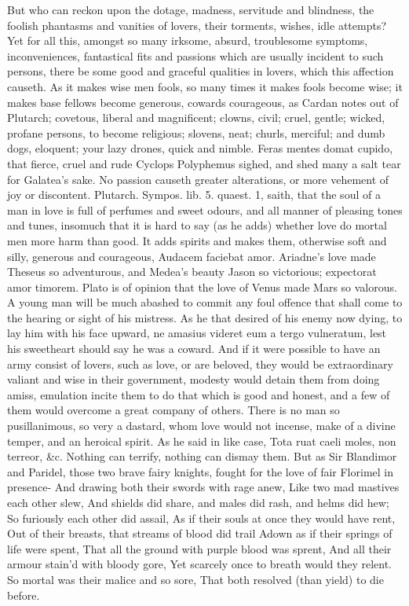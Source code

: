 {But who can reckon upon the dotage, madness, servitude and blindness,
the foolish phantasms and vanities of lovers, their torments, wishes,
idle attempts?
Yet for all this, amongst so many irksome, absurd, troublesome
symptoms, inconveniences, fantastical fits and passions which are
usually incident to such persons, there be some good and graceful
qualities in lovers, which this affection causeth. As it makes wise men
fools, so many times it makes fools become wise; it makes base
fellows become generous, cowards courageous, as Cardan notes out of
Plutarch; covetous, liberal and magnificent; clowns, civil; cruel,
gentle; wicked, profane persons, to become religious; slovens, neat;
churls, merciful; and dumb dogs, eloquent; your lazy drones, quick and
nimble. Feras mentes domat cupido, that fierce, cruel and rude Cyclops
Polyphemus sighed, and shed many a salt tear for Galatea's sake. No
passion causeth greater alterations, or more vehement of joy or
discontent. Plutarch. Sympos. lib. 5. quaest. 1,  saith, that the
soul of a man in love is full of perfumes and sweet odours, and all
manner of pleasing tones and tunes, insomuch that it is hard to say (as
he adds) whether love do mortal men more harm than good. It adds
spirits and makes them, otherwise soft and silly, generous and
courageous, Audacem faciebat amor. Ariadne's love made Theseus so
adventurous, and Medea's beauty Jason so victorious; expectorat amor
timorem. Plato is of opinion that the love of Venus made Mars so
valorous. A young man will be much abashed to commit any foul offence
that shall come to the hearing or sight of his mistress. As he
that desired of his enemy now dying, to lay him with his face upward,
ne amasius videret eum a tergo vulneratum, lest his sweetheart should
say he was a coward. And if it were possible to have an army
consist of lovers, such as love, or are beloved, they would be
extraordinary valiant and wise in their government, modesty would
detain them from doing amiss, emulation incite them to do that which is
good and honest, and a few of them would overcome a great company of
others. There is no man so pusillanimous, so very a dastard, whom love
would not incense, make of a divine temper, and an heroical spirit. As
he said in like case,  Tota ruat caeli moles, non terreor, \&c.
Nothing can terrify, nothing can dismay them. But as Sir Blandimor and
Paridel, those two brave fairy knights, fought for the love of fair
Florimel in presence-
And drawing both their swords with rage anew,
Like two mad mastives each other slew,
And shields did share, and males did rash, and helms did hew;
So furiously each other did assail,
As if their souls at once they would have rent,
Out of their breasts, that streams of blood did trail
Adown as if their springs of life were spent,
That all the ground with purple blood was sprent,
And all their armour stain'd with bloody gore,
Yet scarcely once to breath would they relent.
So mortal was their malice and so sore,
That both resolved (than yield) to die before.

}
